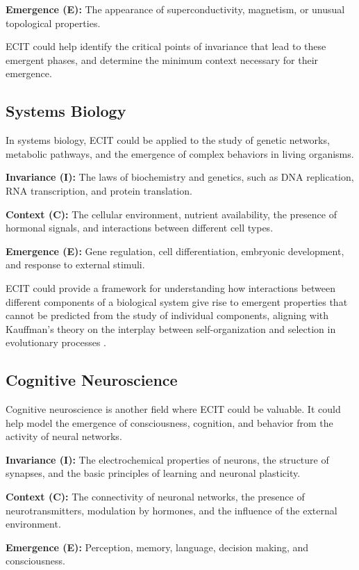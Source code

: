 \documentclass{article}
\begin{document}
\textbf{Emergence (E):} The appearance of superconductivity, magnetism, or unusual topological properties.

ECIT could help identify the critical points of invariance that lead to these emergent phases, and determine the minimum context necessary for their emergence.

\subsection{Systems Biology}

In systems biology, ECIT could be applied to the study of genetic networks, metabolic pathways, and the emergence of complex behaviors in living organisms.

\textbf{Invariance (I):} The laws of biochemistry and genetics, such as DNA replication, RNA transcription, and protein translation.

\textbf{Context (C):} The cellular environment, nutrient availability, the presence of hormonal signals, and interactions between different cell types.

\textbf{Emergence (E):} Gene regulation, cell differentiation, embryonic development, and response to external stimuli.

ECIT could provide a framework for understanding how interactions between different components of a biological system give rise to emergent properties that cannot be predicted from the study of individual components, aligning with Kauffman’s theory on the interplay between self-organization and selection in evolutionary processes \cite{Kauffman1993}.

\subsection{Cognitive Neuroscience}

Cognitive neuroscience is another field where ECIT could be valuable. It could help model the emergence of consciousness, cognition, and behavior from the activity of neural networks.

\textbf{Invariance (I):} The electrochemical properties of neurons, the structure of synapses, and the basic principles of learning and neuronal plasticity.

\textbf{Context (C):} The connectivity of neuronal networks, the presence of neurotransmitters, modulation by hormones, and the influence of the external environment.

\textbf{Emergence (E):} Perception, memory, language, decision making, and consciousness.
\end{document}
